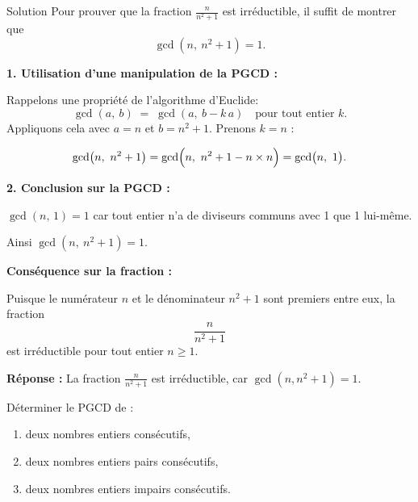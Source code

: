 \documentclass[a4paper,12pt]{article}
\begin{document}
\begin{solutionbox}{Solution}
    Pour prouver que la fraction \(\tfrac{n}{n^2 + 1}\) est irréductible, il suffit de montrer que
    \[
    \gcd(n,\ n^2 + 1) = 1.
    \]
    
    \textbf{1. Utilisation d’une manipulation de la PGCD :}
     
    Rappelons une propriété de l’algorithme d’Euclide:  
    \[
    \gcd(a,\ b) \;=\; \gcd(a,\ b - k\,a)
    \quad\text{pour tout entier }k.
    \]
    Appliquons cela avec \(a = n\) et \(b = n^2 + 1\). Prenons \(k = n\) :
    
    \[
    \gcd\bigl(n,\ n^2 + 1\bigr)
    =\gcd\Bigl(n,\ n^2 + 1 - n\times n\Bigr)
    =\gcd\bigl(n,\ 1\bigr).
    \]
    
    \textbf{2. Conclusion sur la PGCD :}
    
    \(\gcd(n,\,1)=1\) car tout entier n’a de diviseurs communs avec 1 que 1 lui-même.  
    
    Ainsi \(\gcd(n,\ n^2 + 1)=1.\)
    
    \medskip
    
    \textbf{Conséquence sur la fraction :}
    
    Puisque le numérateur \(n\) et le dénominateur \(n^2 + 1\) sont premiers entre eux, la fraction 
    \[
    \frac{n}{n^2 + 1}
    \]
    est irréductible pour tout entier \(n \ge 1\).
    
    \textbf{Réponse :}  
    La fraction \(\tfrac{n}{n^2+1}\) est irréductible, car \(\gcd(n,n^2+1)=1.\)
    \end{solutionbox}

\begin{exercice}[title=Exercice 12 $\quad \star \star \quad$ {[Représenter, Raisonner]}]
Déterminer le PGCD de :
\begin{enumerate}
    \item deux nombres entiers consécutifs,
    \item deux nombres entiers pairs consécutifs,
    \item deux nombres entiers impairs consécutifs.
\end{enumerate}
\end{exercice}
\end{document}
